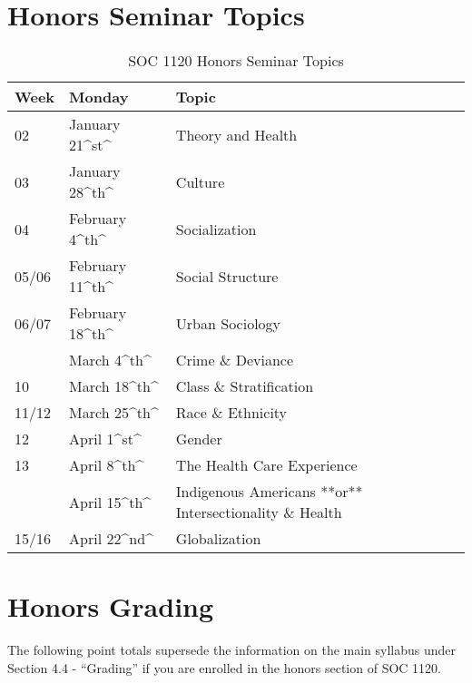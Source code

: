 \documentclass[]{book}
\begin{document}
\hypertarget{honors-seminar-topics}{%
\section{Honors Seminar Topics}\label{honors-seminar-topics}}

\begin{table}[t]

\caption{\label{tab:unnamed-chunk-4}SOC 1120 Honors Seminar Topics}
\centering
\begin{tabular}{lll}
\toprule
Week & Monday & Topic\\
\midrule
02 & January 21\textasciicircum{}st\textasciicircum{} & Theory and Health\\
03 & January 28\textasciicircum{}th\textasciicircum{} & Culture\\
04 & February 4\textasciicircum{}th\textasciicircum{} & Socialization\\
05/06 & February 11\textasciicircum{}th\textasciicircum{} & Social Structure\\
06/07 & February 18\textasciicircum{}th\textasciicircum{} & Urban Sociology\\
\addlinespace
08 & March 4\textasciicircum{}th\textasciicircum{} & Crime \& Deviance\\
10 & March 18\textasciicircum{}th\textasciicircum{} & Class \& Stratification\\
11/12 & March 25\textasciicircum{}th\textasciicircum{} & Race \& Ethnicity\\
12 & April 1\textasciicircum{}st\textasciicircum{} & Gender\\
13 & April 8\textasciicircum{}th\textasciicircum{} & The Health Care Experience\\
\addlinespace
14 & April 15\textasciicircum{}th\textasciicircum{} & Indigenous Americans **or** Intersectionality \& Health\\
15/16 & April 22\textasciicircum{}nd\textasciicircum{} & Globalization\\
\bottomrule
\end{tabular}
\end{table}

\hypertarget{honors-grading}{%
\section{Honors Grading}\label{honors-grading}}

The following point totals supersede the information on the main syllabus under Section 4.4 - ``Grading'' if you are enrolled in the honors section of SOC 1120.
\end{document}
